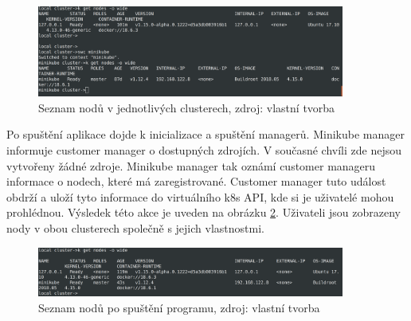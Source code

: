 \begin{figure}[H]
  \begin{centering}
    
	  \includegraphics[width=0.9\textwidth]{images/nodes-init.png}
    \par
	  \caption{Seznam nodů v jednotlivých clusterech\label{fig:nodes-init}, zdroj: vlastní tvorba}
    \end{centering}
\end{figure}

    Po spuštění aplikace dojde k inicializace a spuštění managerů. Minikube manager informuje customer manager o dostupných zdrojích. V současné chvíli zde nejsou vytvořeny žádné zdroje. Minikube manager tak oznámí customer manageru informace o nodech, které má zaregistrované. Customer manager tuto událost obdrží a uloží tyto informace do virtuálního k8s API, kde si je uživatelé mohou prohlédnou. Výsledek této akce je uveden na obrázku \ref{fig:nodes-initialized}. Uživateli jsou zobrazeny nody v obou clusterech společně s jejich vlastnostmi.


\begin{figure}[H]
  \begin{centering}
    
	  \includegraphics[width=0.9\textwidth]{images/nodes-initialized.png}
    \par
	  \caption{Seznam nodů po spuštění programu\label{fig:nodes-initialized}, zdroj: vlastní tvorba}
    \end{centering}
\end{figure}


